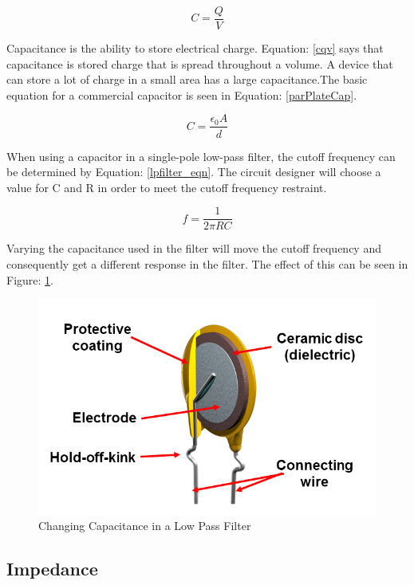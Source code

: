 \begin{equation}
\label{cqv}
C=\frac{Q}{V}
\end{equation}

Capacitance is the ability to store electrical charge. Equation: \eqref{cqv} says that capacitance is stored charge that is spread throughout a volume. A device that can store a lot of charge in a small area has a large capacitance.The basic equation for a commercial capacitor is seen in Equation: \eqref{parPlateCap}.

\begin{equation}
\label{parPlateCap}
C = \frac{\epsilon _0 A}{d}
\end{equation}

When using a capacitor in a single-pole low-pass filter, the cutoff frequency can be determined by Equation: \eqref{lpfilter_eqn}. The circuit designer will choose a value for C and R in order to meet the cutoff frequency restraint.

\begin{equation}
\label{lpfilter_eqn}
f = \frac{1}{2\pi RC}
\end{equation}

Varying the capacitance used in the filter will move the cutoff frequency and consequently get a different response in the filter. The effect of this can be seen in Figure: \ref{lowPassFilt_fig}.

\begin{figure}
\includegraphics[keepaspectratio=true,scale=.5]{./figures/testImage.png}
\centering
\caption{Changing Capacitance in a Low Pass Filter}
\label{lowPassFilt_fig}
\end{figure}

\subsection{Impedance}

